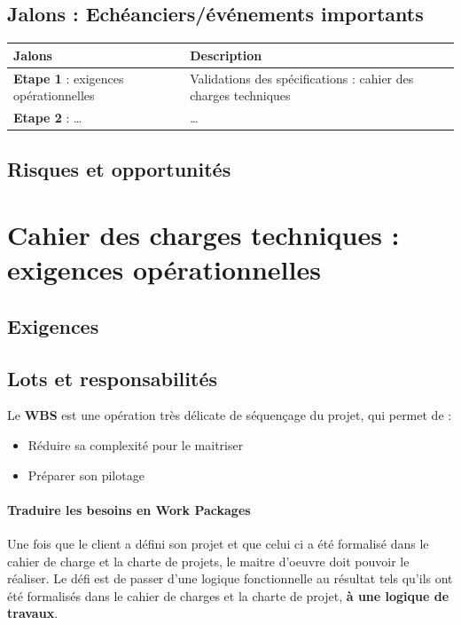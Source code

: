 \subsection{Jalons : Echéanciers/événements importants}
\begin{table}[!h]
    \centering  
    \begin{tabular}{|p{7cm}|p{7cm}|}  
    \hline  
    \textbf{Jalons} & \textbf{Description}\\
    \hline
    \textbf{Etape 1 }: exigences opérationnelles & Validations des spécifications : cahier des charges techniques\\
    \hline
    \textbf{Etape 2} : \dots & \dots\\
    \hline
    \end{tabular}
\end{table}
\subsection{Risques et opportunités}

\section{Cahier des charges techniques : exigences opérationnelles}
\subsection{Exigences}

\subsection{Lots et responsabilités}
Le \textbf{WBS} est une opération très délicate de séquençage du projet, qui permet de :
\begin{itemize}
	\item Réduire sa complexité pour le maitriser
	\item Préparer son pilotage
\end{itemize}
\paragraph*{Traduire les besoins en Work Packages}
Une fois que le client a défini son projet et que celui ci a été formalisé dans le cahier de charge et la charte de projets, le maitre d'oeuvre doit pouvoir le réaliser. Le défi est de passer d'une logique fonctionnelle au résultat tels qu'ils ont été formalisés dans le cahier de charges et la charte de projet, \textbf{à une logique de travaux}.

